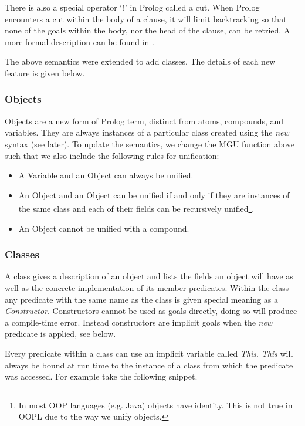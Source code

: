 \documentclass[12pt,a4paper,twoside,openright]{report}
\begin{document}
\bigskip

There is also a special operator `!' in Prolog called a cut. When Prolog encounters a cut within the body of a clause, it will limit backtracking so that none of the goals within the body, nor the head of the clause, can be retried. A more formal description can be found in \cite{MYCROFT}.

\bigskip

The above semantics were extended to add classes. The details of each new feature is given below.

\subsubsection {Objects}

Objects are a new form of Prolog term, distinct from atoms, compounds, and variables. They are always instances of a particular class created using the \emph{new} syntax (see later). To update the semantics, we change the MGU function above such that we also include the following rules for unification:

\begin{itemize}
	\item A Variable and an Object can always be unified.
	\item An Object and an Object can be unified if and only if they are instances of the same class and each of their fields can be recursively unified\footnote{In most OOP languages (e.g. Java) objects have identity. This is not true in OOPL due to the way we unify objects.}.
	\item An Object cannot be unified with a compound.
\end{itemize}

\subsubsection {Classes}

A class gives a description of an object and lists the fields an object will have as well as the concrete implementation of its member predicates. Within the class any predicate with the same name as the class is given special meaning as a \emph{Constructor}. Constructors cannot be used as goals directly, doing so will produce a compile-time error. Instead constructors are implicit goals when the \emph{new} predicate is applied, see below.

\bigskip

Every predicate within a class can use an implicit variable called \emph{This}. \emph{This} will always be bound at run time to the instance of a class from which the predicate was accessed. For example take the following snippet.
\end{document}
